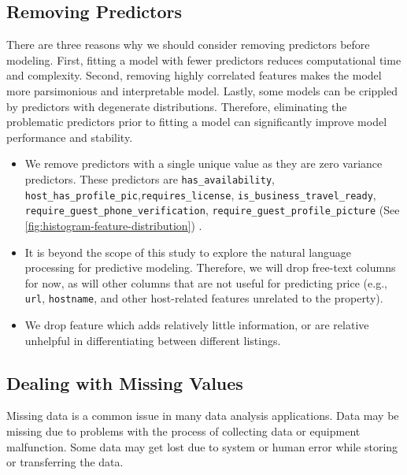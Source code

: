 \subsection{Removing Predictors}

There are three reasons why we should consider removing predictors before
modeling. First, fitting a model with fewer predictors reduces computational
time and complexity. Second, removing highly correlated features makes the model
more parsimonious and interpretable model.  Lastly, some models can be crippled
by predictors with degenerate distributions.  Therefore, eliminating the
problematic predictors prior to fitting a model can significantly improve model
performance and stability.
\begin{itemize}

    \item We remove  predictors with a single unique value as they are  zero
        variance predictors. These predictors are \texttt{has\_availability},
        \texttt{host\_has\_profile\_pic},\texttt{requires\_license},
        \texttt{is\_business\_travel\_ready},
        \texttt{require\_guest\_phone\_verification},\newline
        \texttt{require\_guest\_profile\_picture} (See
        \ref{fig:histogram-feature-distribution}) .
    \item It is beyond the scope of this study to explore the natural language
        processing for predictive modeling.  Therefore,  we will drop free-text
        columns for now, as will other columns that are not useful for
        predicting price (e.g., \texttt{url}, \texttt{hostname}, and other host-related features
        unrelated to the property).

    \item We drop feature which  adds relatively little information, or are
        relative unhelpful in differentiating between different listings.

\end{itemize}

\subsection{Dealing with Missing Values}

Missing data is a common issue in many data analysis applications.  Data may be
missing due to problems with the process of collecting data or equipment
malfunction. Some data may get lost due to system or human error while storing
or transferring the data.

